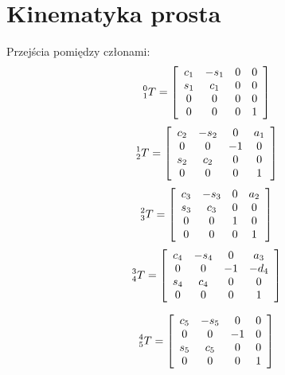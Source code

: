 \documentclass[]{article}
\begin{document}
\section{Kinematyka prosta}
Przejścia pomiędzy członami:
\[\prescript{0}{1}{T}=\begin{bmatrix}
\begin{array}{cccc}
c_1 & -s_1 & 0 & 0 \\
s_1 & c_1 & 0 & 0 \\
0 & 0 & 0 & 0 \\
0 & 0 & 0 & 1 \\
\end{array}
\end{bmatrix}
\]
\[\prescript{1}{2}{T}=\begin{bmatrix}
\begin{array}{cccc}
c_2 & -s_2 & 0 & a_1 \\
0 & 0 & -1 & 0 \\
s_2 & c_2 & 0 & 0 \\
0 & 0 & 0 & 1 \\
\end{array}
\end{bmatrix}
\]
\[\prescript{2}{3}{T}=\begin{bmatrix}
\begin{array}{cccc}
c_3 & -s_3 & 0 & a_2 \\
s_3 & c_3 & 0 & 0 \\
0 & 0 & 1 & 0 \\
0 & 0 & 0 & 1 \\
\end{array}
\end{bmatrix}
\]
\[\prescript{3}{4}{T}=\begin{bmatrix}
\begin{array}{cccc}
c_4 & -s_4 & 0 & a_3 \\
0 & 0 & -1 & -d_4 \\
s_4 & c_4 & 0 & 0 \\
0 & 0 & 0 & 1 \\
\end{array}
\end{bmatrix}
\]

\[\prescript{4}{5}{T}=\begin{bmatrix}
\begin{array}{cccc}
c_5 & -s_5 & 0 & 0 \\
0 & 0 & -1 & 0 \\
s_5 & c_5 & 0 & 0 \\
0 & 0 & 0 & 1 \\
\end{array}
\end{bmatrix}
\]
\end{document}
